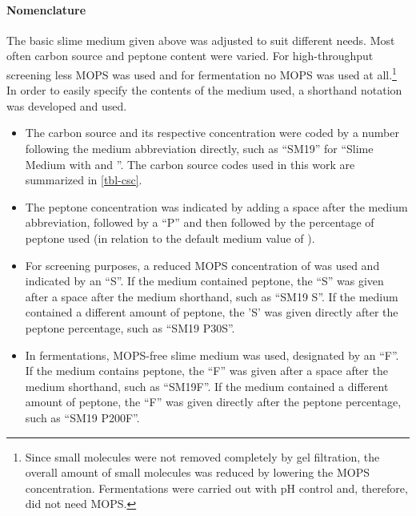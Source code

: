\paragraph{Nomenclature}
The basic slime medium given above was adjusted to suit different needs. Most often carbon source and peptone content were varied. For high-throughput screening less MOPS was used and for fermentation no MOPS was used at all.\footnote{Since small molecules were not removed completely by gel filtration, the overall amount of small molecules was reduced by lowering the MOPS concentration. Fermentations were carried out with pH control and, therefore, did not need MOPS.} In order to easily specify the contents of the medium used, a shorthand notation was developed and used.
\begin{itemize}
	\item The carbon source and its respective concentration were coded by a number following the medium abbreviation directly, such as \enquote{SM19} for \enquote{Slime Medium with  \glc{} and  \xyl{}}. The carbon source codes used in this work are summarized in \vref{tbl-csc}.
	\item The peptone concentration was indicated by adding a space after the medium abbreviation, followed by a \enquote{P} and then followed by the percentage of peptone used (in relation to the default medium value of ).
	\item For screening purposes, a reduced MOPS concentration of  was used and indicated by an \enquote{S}. If the medium contained  peptone, the \enquote{S} was given after a space after the medium shorthand, such as \enquote{SM19 S}. If the medium contained a different amount of peptone, the 'S' was given directly after the peptone percentage, such as \enquote{SM19 P30S}.
	\item In fermentations, MOPS-free slime medium was used, designated by an \enquote{F}. If the medium contains  peptone, the \enquote{F} was given after a space after the medium shorthand, such as \enquote{SM19F}. If the medium contained a different amount of peptone, the \enquote{F} was given directly after the peptone percentage, such as \enquote{SM19 P200F}.
\end{itemize}

